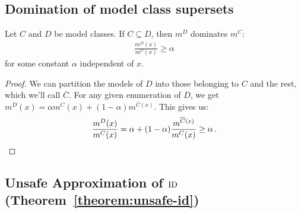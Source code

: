 \subsection{Domination of model class supersets}

\begin{lemma}
Let $C$ and $D$ be model classes. If $C \subseteq D$, then $m^D$ dominates $m^C$:
\begin{align*}
\frac{m^D(x)}{m^C(x)} \geq \alpha
\end{align*}
for some constant $\alpha$ independent of $x$.
\label{lemma:subset-dominance}
\end{lemma}
\begin{proof}
We can partition the models of $D$ into those belonging to $C$ and the rest, which we'll call $\overline{C}$. For any given enumeration of $D$, we get $m^D(x) = \alpha m^C(x) + (1-\alpha)m^{\overline{C}(x)}$. This gives us:
\begin{align*}
\frac{m^D(x)}{m^C(x)} = \alpha + (1-\alpha)\frac{m^{\overline{C}(x)}}{m^C(x)} \geq \alpha \,\text{.}
\end{align*}
\end{proof}

\subsection{Unsafe Approximation of $\operatorname*{ID}$ (Theorem~\ref{theorem:unsafe-id})}

